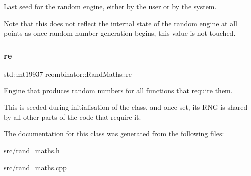 Last seed for the random engine, either by the user or by the system. 

Note that this does not reflect the internal state of the random engine at all points as once random number generation begins, this value is not touched. \mbox{\label{classrcombinator_1_1RandMaths_a6b760d6877e9bb7e7001e9e47f38a0b2}} 
\subsubsection{\texorpdfstring{re}{re}}
{\footnotesize\ttfamily std\+::mt19937 rcombinator\+::\+Rand\+Maths\+::re\hspace{0.3cm}{\ttfamily [private]}}



Engine that produces random numbers for all functions that require them. 

This is seeded during initialisation of the class, and once set, its R\+NG is shared by all other parts of the code that require it. 

The documentation for this class was generated from the following files\+:\begin{DoxyCompactItemize}
\item 
src/\mbox{\hyperlink{rand__maths_8h}{rand\+\_\+maths.\+h}}\item 
src/rand\+\_\+maths.\+cpp\end{DoxyCompactItemize}
